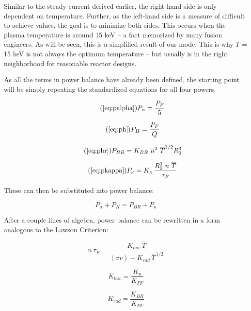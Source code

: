 Similar to the steady current derived earlier, the right-hand side is only dependent on temperature. Further, as the left-hand side is a measure of difficult to achieve values, the goal is to minimize both sides. This occurs when the plasma temperature is around 15 keV -- a fact memorized by many fusion engineers. As will be seen, this is a simplified result of our mode. This is why $\overline T$ = 15 keV is not always the optimum temperature -- but usually is in the right neighborhood for reasonable reactor designs.

As all the terms in power balance have already been defined, the starting point will be simply repeating the standardized equations for all four powers.

\begin{equation}
	\tag{\ref{eq:palpha}}
	P_\alpha = \frac{P_F}{5}
\end{equation}

\begin{equation}
	\tag{\ref{eq:ph}}
	P_H = \frac{P_F}{Q}
\end{equation}

\begin{equation}
	\tag{\ref{eq:pbr}}
	P_{BR} = K_{BR} \ \overline n ^ 2 \ \overline T ^ {1/2} R_0^3 
\end{equation}

\begin{equation}
	\tag{\ref{eq:pkappa}}
	P_\kappa = K_\kappa \, \frac{ R_0 ^ 3 \ \overline{n}  \ \overline{T}  }{\tau_E} 
\end{equation}

These can then be substituted into power balance:

\begin{equation}
	P_\alpha + P_H = P_{BR} + P_\kappa
\end{equation}

After a couple lines of algebra, power balance can be rewritten in a form analogous to the Lawson Criterion:

\begin{equation}
	\label{eq:ntaue}
	 \overline{n}  \, \tau_E = \frac{ K_{law} \, \overline{T} }{ (\sigma v) - K_{rad} \, \overline{T}^{  \,1/2 } }
\end{equation}

\begin{equation}
	K_{law} = \frac{K_\kappa}{K_{PF}}
\end{equation}

\begin{equation}
	K_{rad} = \frac{K_{BR}}{K_{PF}}
\end{equation}

